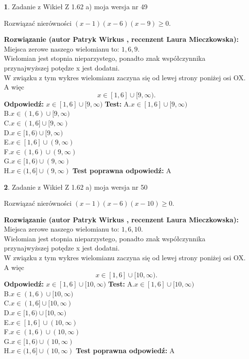 \documentclass[12pt, a4paper]{article}
\theoremstyle{definition} %
\newtheorem{zad}{}
\newcommand{\zadStart}[1]{\begin{zad}#1\newline}
\newcommand{\zadStop}{\end{zad}}
\newcommand{\rozwStart}[2]{\noindent \textbf{Rozwiązanie (autor #1 , recenzent #2): }\newline}
\newcommand{\rozwStop}{\newline}
\newcommand{\odpStart}{\noindent \textbf{Odpowiedź:}\newline}
\newcommand{\odpStop}{\newline}
\newcommand{\testStart}{\noindent \textbf{Test:}\newline}
\newcommand{\testStop}{\newline}
\newcommand{\kluczStart}{\noindent \textbf{Test poprawna odpowiedź:}\newline}
\newcommand{\kluczStop}{\newline}
\begin{document}
\zadStart{Zadanie z Wikieł Z 1.62 a) moja wersja nr 49}

Rozwiązać nierówności $(x-1)(x-6)(x-9)\ge0$.
\zadStop
\rozwStart{Patryk Wirkus}{Laura Mieczkowska}
Miejsca zerowe naszego wielomianu to: $1, 6, 9$.\\
Wielomian jest stopnia nieparzystego, ponadto znak współczynnika przy\linebreak najwyższej potędze x jest dodatni.\\ W związku z tym wykres wielomianu zaczyna się od lewej strony poniżej osi OX. A więc $$x \in [1,6] \cup [9,\infty).$$
\rozwStop
\odpStart
$x \in [1,6] \cup [9,\infty)$
\odpStop
\testStart
A.$x \in [1,6] \cup [9,\infty)$\\
B.$x \in (1,6) \cup [9,\infty)$\\
C.$x \in (1,6] \cup [9,\infty)$\\
D.$x \in [1,6) \cup [9,\infty)$\\
E.$x \in [1,6] \cup (9,\infty)$\\
F.$x \in (1,6) \cup (9,\infty)$\\
G.$x \in [1,6) \cup (9,\infty)$\\
H.$x \in (1,6] \cup (9,\infty)$
\testStop
\kluczStart
A
\kluczStop



\zadStart{Zadanie z Wikieł Z 1.62 a) moja wersja nr 50}

Rozwiązać nierówności $(x-1)(x-6)(x-10)\ge0$.
\zadStop
\rozwStart{Patryk Wirkus}{Laura Mieczkowska}
Miejsca zerowe naszego wielomianu to: $1, 6, 10$.\\
Wielomian jest stopnia nieparzystego, ponadto znak współczynnika przy\linebreak najwyższej potędze x jest dodatni.\\ W związku z tym wykres wielomianu zaczyna się od lewej strony poniżej osi OX. A więc $$x \in [1,6] \cup [10,\infty).$$
\rozwStop
\odpStart
$x \in [1,6] \cup [10,\infty)$
\odpStop
\testStart
A.$x \in [1,6] \cup [10,\infty)$\\
B.$x \in (1,6) \cup [10,\infty)$\\
C.$x \in (1,6] \cup [10,\infty)$\\
D.$x \in [1,6) \cup [10,\infty)$\\
E.$x \in [1,6] \cup (10,\infty)$\\
F.$x \in (1,6) \cup (10,\infty)$\\
G.$x \in [1,6) \cup (10,\infty)$\\
H.$x \in (1,6] \cup (10,\infty)$
\testStop
\kluczStart
A
\kluczStop
\end{document}
